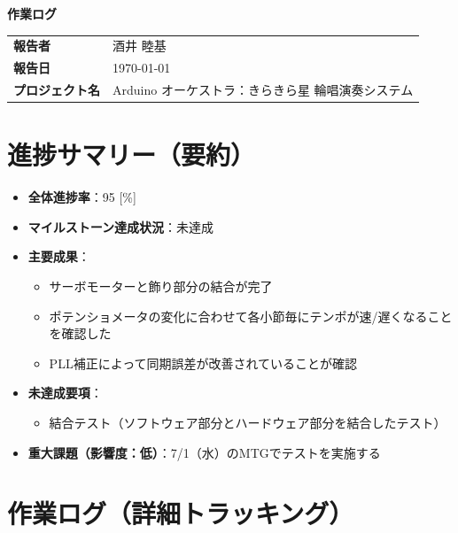 \documentclass[a4paper,12pt]{ltjsarticle}
\begin{document}
\begin{center}
  {\LARGE\bfseries 作業ログ}
\end{center}

\vspace{4mm}

\begin{tabular}{ll}
  \textbf{報告者} & 酒井 睦基 \\
  \textbf{報告日} & \today \\
  \textbf{プロジェクト名} & Arduino オーケストラ：きらきら星 輪唱演奏システム \\
\end{tabular}

\vspace{6mm}

\section{進捗サマリー（要約）}

\begin{itemize}
  \item \textbf{全体進捗率}：95 [\%]
  \item \textbf{マイルストーン達成状況}：未達成
  \item \textbf{主要成果}：
    \begin{itemize}
      \item サーボモーターと飾り部分の結合が完了
      \item ポテンショメータの変化に合わせて各小節毎にテンポが速/遅くなることを確認した
      \item PLL補正によって同期誤差が改善されていることが確認
    \end{itemize}
  \item \textbf{未達成要項}：
    \begin{itemize}
      \item 結合テスト（ソフトウェア部分とハードウェア部分を結合したテスト）
    \end{itemize}
  \item \textbf{重大課題（影響度：低）}：7/1（水）のMTGでテストを実施する
\end{itemize}

\section{作業ログ（詳細トラッキング）}
\end{document}
